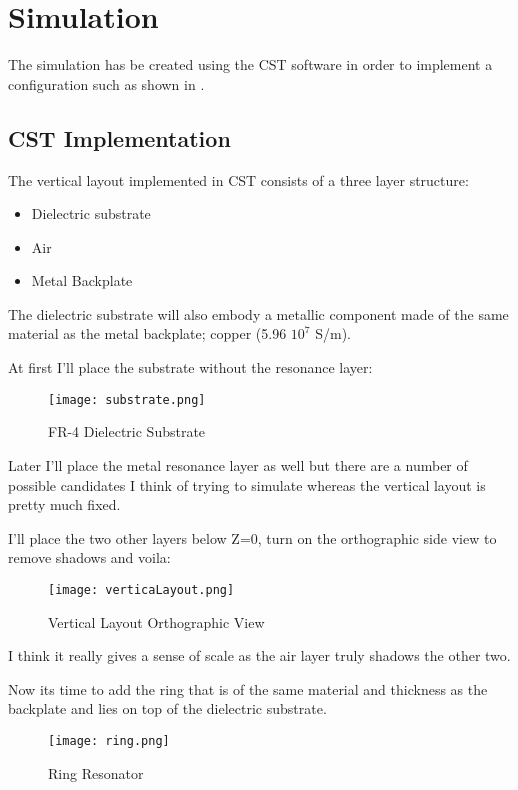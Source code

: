 \section{\textsf{Simulation}}
    The simulation has be created using the CST software in order to implement a configuration such as shown in \cite{zhang_design_2023}.

    \subsection{\textsf{CST Implementation}}
        The vertical layout implemented in CST consists of a three layer structure:
        \begin{itemize}
            \item Dielectric substrate
            \item Air
            \item Metal Backplate
        \end{itemize}

        The dielectric substrate will also embody a metallic component made of the same material as the metal backplate; copper
        (5.96 \mu $10^7$ S/m).

        At first I'll place the substrate without the resonance layer:  
        \begin{figure}[h]
            \centering
            \texttt{[image: substrate.png]}
            \caption{FR-4 Dielectric Substrate}
            \label{img:substrate}
        \end{figure}

        Later I'll place the metal resonance layer as well but there are a number of possible candidates
        I think of trying to simulate whereas the vertical layout is pretty much fixed.

        I'll place the two other layers below Z=0, turn on the orthographic side
        view to remove shadows and voila: 
        \begin{figure}[h]
            \centering
            \texttt{[image: verticaLayout.png]}
            \caption{Vertical Layout Orthographic View}
            \label{img:verticaLayout}
        \end{figure}
        I think it really gives a sense of scale as the air layer truly shadows the other two.

        Now its time to add the ring that is of the same material and thickness as the backplate and lies
        on top of the dielectric substrate. 
        \begin{figure}[h]
            \centering
            \texttt{[image: ring.png]}
            \caption{Ring Resonator}
            \label{img:ring}
        \end{figure}

